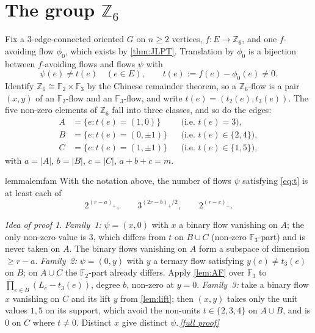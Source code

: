 \documentclass[11pt,a4paper]{article}
\theoremstyle{plain}
\theoremstyle{definition}
\theoremstyle{remark}
\newtheorem*{proofidea}{Idea of proof}
\newcommand{\fullproofref}[1]{\,\hyperref[#1]{\textit{[full proof]}}}
\newcommand{\F}{{\mathbb F}}
\newcommand{\Z}{{\mathbb Z}}
\newcommand{\pos}[1]{(#1)_{+}}
\begin{document}
\section{The group \texorpdfstring{$\Z_6$}{Z6}}\label{sec:z6}

Fix a $3$-edge-connected oriented $G$ on $n\ge2$ vertices, $f\colon E\to\Z_6$, and one $f$-avoiding flow $\phi_0$, which exists by \cref{thm:JLPT}. Translation by $\phi_0$ is a bijection between $f$-avoiding flows and flows $\psi$ with
\begin{equation}\label{eq:t}
 \psi(e)\ne t(e)\quad(e\in E),\qquad t(e):=f(e)-\phi_0(e)\ne0 .
\end{equation}
Identify $\Z_6\cong\F_2\times\F_3$ by the Chinese remainder theorem, so a $\Z_6$-flow is a pair $(x,y)$ of an $\F_2$-flow and an $\F_3$-flow, and write $t(e)=(t_2(e),t_3(e))$. The five non-zero elements of $\Z_6$ fall into three classes, and so do the edges:
\begin{equation}\label{eq:ABC}
\begin{aligned}
 A&=\{e: t(e)=(1,0)\}   &&\text{(i.e.\ $t(e)=3$)},\\
 B&=\{e: t(e)=(0,\pm1)\} &&\text{(i.e.\ $t(e)\in\{2,4\}$)},\\
 C&=\{e: t(e)=(1,\pm1)\} &&\text{(i.e.\ $t(e)\in\{1,5\}$)},
\end{aligned}
\end{equation}
with $a=|A|$, $b=|B|$, $c=|C|$, $a+b+c=m$.

\begin{restatable}{lemma}{lemfam}\label{lem:fam}
With the notation above, the number of flows $\psi$ satisfying \eqref{eq:t} is at least each of
\[
 2^{\pos{r-a}},\qquad 3^{\pos{2r-b}/2},\qquad 2^{\pos{r-c}} .
\]
\end{restatable}
\begin{proofidea}
\emph{Family~1:} $\psi=(x,0)$ with $x$ a binary flow vanishing on $A$; the only non-zero value is $3$, which differs from $t$ on $B\cup C$ (non-zero $\F_3$-part) and is never taken on $A$. The binary flows vanishing on $A$ form a subspace of dimension $\ge r-a$.
\emph{Family~2:} $\psi=(0,y)$ with $y$ a ternary flow satisfying $y(e)\ne t_3(e)$ on $B$; on $A\cup C$ the $\F_2$-part already differs. Apply \cref{lem:AF} over $\F_3$ to $\prod_{e\in B}(L_e-t_3(e))$, degree $b$, non-zero at $y=0$.
\emph{Family~3:} take a binary flow $x$ vanishing on $C$ and its lift $y$ from \cref{lem:lift}; then $(x,y)$ takes only the unit values $1,5$ on its support, which avoid the non-units $t\in\{2,3,4\}$ on $A\cup B$, and is $0$ on $C$ where $t\ne0$. Distinct $x$ give distinct $\psi$.\fullproofref{pf:fam}
\end{proofidea}
\end{document}
